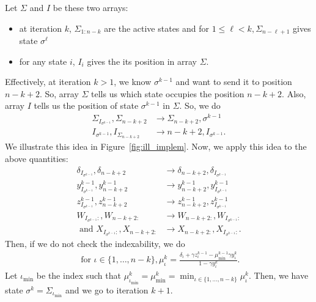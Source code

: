 \begin{subappendices}
Let $\Sigma$ and $I$ be these two arrays:
\begin{itemize}
    \item at iteration $k$, $\Sigma_{1:n-k}$ are the active states and for $1\le\ell<k, \Sigma_{n-\ell+1}$ gives state $\sigma^{\ell}$
    \item for any state $i$, $I_{i}$ gives the its position in array $\Sigma$.
\end{itemize}
Effectively, at iteration $k>1$, we know $\sigma^{k-1}$ and want to send it to position $n-k+2$. So, array $\Sigma$ tells us which state occupies the position $n-k+2$. Also, array $I$ tells us the position of state $\sigma^{k-1}$ in $\Sigma$.
So, we do
\begin{align*}
    \Sigma_{I_{\sigma^{k-1}}}, \Sigma_{n-k+2} &\rightarrow \Sigma_{n-k+2}, \sigma^{k-1}  \\
    I_{\sigma^{k-1}}, I_{\Sigma_{n-k+2}} &\rightarrow n-k+2, I_{\sigma^{k-1}}.
\end{align*}
We illustrate this idea in Figure~\ref{fig:ill_implem}. Now, we apply this idea to the above quantities:
\begin{align*}
    \delta_{I_{\sigma^{k-1}}}, \delta_{n-k+2} &\rightarrow \delta_{n-k+2}, \delta_{I_{\sigma^{k-1}}} \\
    y^{k-1}_{I_{\sigma^{k-1}}}, y^{k-1}_{n-k+2} &\rightarrow y^{k-1}_{n-k+2}, y^{k-1}_{I_{\sigma^{k-1}}} \\
    z^{k-1}_{I_{\sigma^{k-1}}}, z^{k-1}_{n-k+2} &\rightarrow z^{k-1}_{n-k+2}, z^{k-1}_{I_{\sigma^{k-1}}} \\
    W_{I_{\sigma^{k-1}}:}, W_{n-k+2:} &\rightarrow W_{n-k+2:}, W_{I_{\sigma^{k-1}}:} \\
    \text{ and } X_{I_{\sigma^{k-1}}:}, X_{n-k+2:} &\rightarrow X_{n-k+2:}, X_{I_{\sigma^{k-1}}:}.
\end{align*}
Then, if we do not check the indexability, we do
\begin{align*}
    \text{ for } \iota\in\{1,\dots,n-k\}, \mu^k_\iota =\frac{\delta_\iota +\gamma z^{k-1}_\iota-\mu^{k-1}_{\min} \gamma y^k_\iota}{1-\gamma y^k_\iota}.
\end{align*}
Let $\iota_{\min}$ be the index such that $\mu^k_{\iota_{\min}}=\mu^k_{\min}= \displaystyle\min_{\iota\in\{1,\dots,n-k\}}\mu^k_\iota$. Then, we have state $\sigma^k=\Sigma_{\iota_{\min}}$ and we go to iteration $k+1$.


\end{subappendices}
